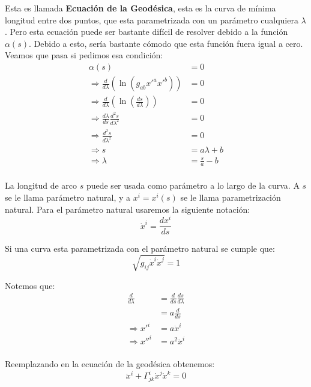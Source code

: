 \documentclass[12pt]{report}
\begin{document}
Esta es llamada \textbf{Ecuaci\'on de la Geod\'esica}, esta es la curva de mínima longitud entre dos puntos, que esta parametrizada 
con un parámetro cualquiera $\lambda$. Pero esta ecuaci\'on puede ser bastante dif\'icil de resolver debido a la funci\'on $\alpha(s)$. 
Debido a esto, ser\'ia bastante cómodo que esta funci\'on fuera igual a cero. Veamos que pasa si pedimos esa condici\'on:
	\begin{align*}
		\alpha(s) &= 0 \\
		\Rightarrow \frac{d}{d\lambda} \left( \ln \left( g_{ab} x'^{a}x'^{b}\right) \right) &= 0 \\
		\Rightarrow \frac{d}{d\lambda} \left( \ln \left( \frac{ds}{d\lambda }\right) \right) &= 0 \\
		\Rightarrow \frac{d\lambda}{ds}\frac{d^{2}s}{d\lambda^{2}} &= 0 \\
		\Rightarrow \frac{d^{2}s}{d\lambda^{2}} &= 0 \\
		\Rightarrow s &= a \lambda + b \\  
		\Rightarrow \lambda &= \frac{s}{a} - b \\
	\end{align*}

La longitud de arco $s$ puede ser usada como par\'ametro a lo largo de la curva. A $s$ se le llama par\'ametro natural, y a $x^{i} = x^{i}(s)$ 
se le llama parametrizaci\'on natural. Para el par\'ametro natural usaremos la siguiente notaci\'on:
	\begin{equation*}
		\dot{x}^{i} = \frac{dx^{i}}{ds}
	\end{equation*}

Si una curva esta parametrizada con el par\'ametro natural se cumple que:
	\begin{equation*}
		 \sqrt{g_{ij}\dot{x}^{i} \dot{x}^{j}} = 1
	\end{equation*}

Notemos que:
	\begin{align*}
		\frac{d}{d\lambda} &= \frac{d}{ds}\frac{ds}{d\lambda} \\ 
						   &= a\frac{d}{ds} \\
		\Rightarrow x'^{i} &= a \dot{x}^{i} \\
		\Rightarrow x''^{i} &= a^{2} \ddot{x}^{i} \\
 	\end{align*}
	
Reemplazando en la ecuaci\'on de la geod\'esica	obtenemos:
	\begin{equation*}
		\ddot{x}^{i} + \Gamma^{i}_{jk} \dot{x}^{j}\dot{x}^{k} = 0
	\end{equation*}
\end{document}
